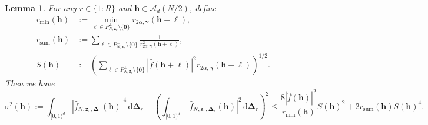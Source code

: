 \documentclass[a4paper,11pt]{article}
\newtheorem{lemma}[theorem]{Lemma}
\newcommand{\rd}{\, \mathrm{d}}
\newcommand{\bszero}{\boldsymbol{0}}
\newcommand{\bsh}{\boldsymbol{h}}
\newcommand{\bsl}{\boldsymbol{\ell}}
\newcommand{\bsz}{\boldsymbol{z}}
\newcommand{\bsgamma}{\boldsymbol{\gamma}}
\newcommand{\bsDelta}{\boldsymbol{\Delta}}
\begin{document}
\begin{lemma}\label{lem:2ndmomentbound} 
For any $r\in\{1{:}R\}$ and $\bsh\in \mathcal{A}_d(N/2)$, define
\begin{align*}
    r_{\min}(\bsh) & :=\min_{\bsl\in P_{N,\boldsymbol{z}_r}^\perp\setminus \{\bszero\}}r_{2\alpha, \bsgamma}(\bsh+\bsl),\\
    r_{\mathrm{sum}}(\bsh) & :=\sum_{\bsl\in P_{N,\boldsymbol{z}_r}^\perp\setminus \{\bszero\}} \frac{1}{r^2_{2\alpha, \bsgamma}(\bsh+\bsl)},\\
    S(\bsh) & :=\left(\sum_{\bsl\in P_{N,\boldsymbol{z}_r}^\perp\setminus \{\bszero\} }|\widehat{f}(\bsh+\bsl)|^2r_{2\alpha, \bsgamma}(\bsh+\bsl)\right)^{1/2}.
\end{align*}
Then we have
\[ 
    \sigma^2(\bsh):=\int_{[0,1)^d} |\widehat{f}_{N,\bsz_r,\bsDelta_r}(\bsh)|^4\rd\bsDelta_r-\left(\int_{[0,1)^d} |\widehat{f}_{N,\bsz_r,\bsDelta_r}(\bsh)|^2\rd\bsDelta_r\right)^2 \leq  \frac{8|\widehat{f}(\bsh)|^2}{r_{\min}(\bsh)}S(\bsh)^2+2r_{\mathrm{sum}}(\bsh)S(\bsh)^4.
\]
\end{lemma}
\end{document}
